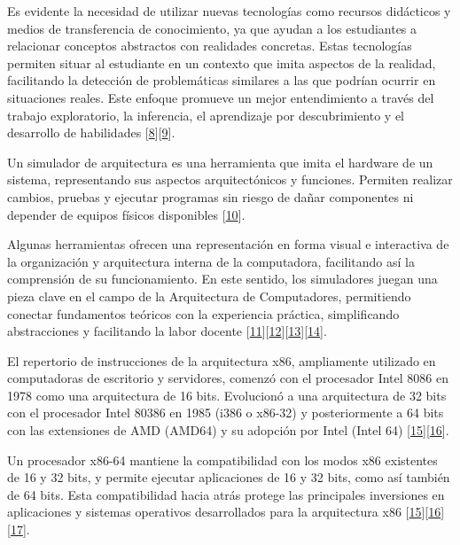 \documentclass[12pt,twoside]{templates/unerthesis}
\begin{document}
Es evidente la necesidad de utilizar nuevas tecnologías como recursos didácticos y medios de transferencia de conocimiento, ya que ayudan a los estudiantes a relacionar conceptos abstractos con realidades concretas. Estas tecnologías permiten situar al estudiante en un contexto que imita aspectos de la realidad, facilitando la detección de problemáticas similares a las que podrían ocurrir en situaciones reales. Este enfoque promueve un mejor entendimiento a través del trabajo exploratorio, la inferencia, el aprendizaje por descubrimiento y el desarrollo de habilidades {[}\protect\hyperlink{ref-nova_tool_2013}{8}{]}{[}\protect\hyperlink{ref-mustafa_evaluating_2010}{9}{]}.

Un simulador de arquitectura es una herramienta que imita el hardware de un sistema, representando sus aspectos arquitectónicos y funciones. Permiten realizar cambios, pruebas y ejecutar programas sin riesgo de dañar componentes ni depender de equipos físicos disponibles {[}\protect\hyperlink{ref-radivojevic_design_2011}{10}{]}.

Algunas herramientas ofrecen una representación en forma visual e interactiva de la organización y arquitectura interna de la computadora, facilitando así la comprensión de su funcionamiento. En este sentido, los simuladores juegan una pieza clave en el campo de la Arquitectura de Computadores, permitiendo conectar fundamentos teóricos con la experiencia práctica, simpliﬁcando abstracciones y facilitando la labor docente {[}\protect\hyperlink{ref-nikolic_survey_2009}{11}{]}{[}\protect\hyperlink{ref-hasan_survey_2012}{12}{]}{[}\protect\hyperlink{ref-hennessy_computer_2012}{13}{]}{[}\protect\hyperlink{ref-stallings_computer_2013}{14}{]}.

El repertorio de instrucciones de la arquitectura x86, ampliamente utilizado en computadoras de escritorio y servidores, comenzó con el procesador Intel 8086 en 1978 como una arquitectura de 16 bits. Evolucionó a una arquitectura de 32 bits con el procesador Intel 80386 en 1985 (i386 o x86-32) y posteriormente a 64 bits con las extensiones de AMD (AMD64) y su adopción por Intel (Intel 64) {[}\protect\hyperlink{ref-intel_64_2016}{15}{]}{[}\protect\hyperlink{ref-amd_developer_2019}{16}{]}.

Un procesador x86-64 mantiene la compatibilidad con los modos x86 existentes de 16 y 32 bits, y permite ejecutar aplicaciones de 16 y 32 bits, como así también de 64 bits. Esta compatibilidad hacia atrás protege las principales inversiones en aplicaciones y sistemas operativos desarrollados para la arquitectura x86 {[}\protect\hyperlink{ref-intel_64_2016}{15}{]}{[}\protect\hyperlink{ref-amd_developer_2019}{16}{]}{[}\protect\hyperlink{ref-abel_ibm_2000}{17}{]}.
\end{document}
